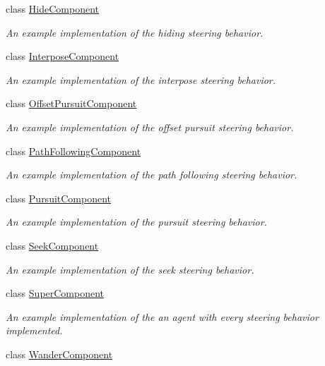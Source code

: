 \begin{DoxyCompactItemize}
class \hyperlink{classsteer_1_1_hide_component}{Hide\-Component}
\begin{DoxyCompactList}\small\item\em An example implementation of the hiding steering behavior. \end{DoxyCompactList}\item 
class \hyperlink{classsteer_1_1_interpose_component}{Interpose\-Component}
\begin{DoxyCompactList}\small\item\em An example implementation of the interpose steering behavior. \end{DoxyCompactList}\item 
class \hyperlink{classsteer_1_1_offset_pursuit_component}{Offset\-Pursuit\-Component}
\begin{DoxyCompactList}\small\item\em An example implementation of the offset pursuit steering behavior. \end{DoxyCompactList}\item 
class \hyperlink{classsteer_1_1_path_following_component}{Path\-Following\-Component}
\begin{DoxyCompactList}\small\item\em An example implementation of the path following steering behavior. \end{DoxyCompactList}\item 
class \hyperlink{classsteer_1_1_pursuit_component}{Pursuit\-Component}
\begin{DoxyCompactList}\small\item\em An example implementation of the pursuit steering behavior. \end{DoxyCompactList}\item 
class \hyperlink{classsteer_1_1_seek_component}{Seek\-Component}
\begin{DoxyCompactList}\small\item\em An example implementation of the seek steering behavior. \end{DoxyCompactList}\item 
class \hyperlink{classsteer_1_1_super_component}{Super\-Component}
\begin{DoxyCompactList}\small\item\em An example implementation of the an agent with every steering behavior implemented. \end{DoxyCompactList}\item 
class \hyperlink{classsteer_1_1_wander_component}{Wander\-Component}

\end{DoxyCompactItemize}
